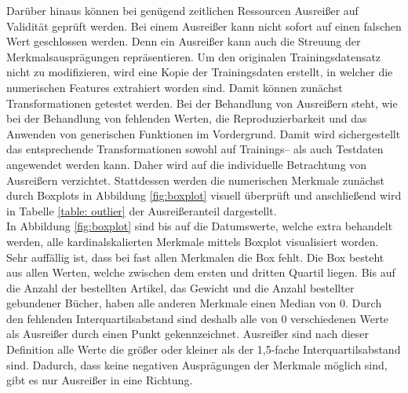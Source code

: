 Darüber hinaus können bei genügend zeitlichen Ressourcen Ausreißer auf Validität geprüft werden. Bei einem Ausreißer kann nicht sofort auf einen falschen Wert geschlossen werden. Denn ein Ausreißer kann auch die Streuung der Merkmalsausprägungen repräsentieren. Um den originalen Trainingsdatensatz nicht zu modifizieren, wird eine Kopie der Trainingsdaten erstellt, in welcher die numerischen Features extrahiert worden sind. Damit können zunächst Transformationen getestet werden. Bei der Behandlung von Ausreißern steht, wie bei der Behandlung von fehlenden Werten, die Reproduzierbarkeit und das Anwenden von generischen Funktionen im Vordergrund. Damit wird sichergestellt das entsprechende Transformationen sowohl auf Trainings– als auch Testdaten angewendet werden kann. Daher wird auf die individuelle Betrachtung von Ausreißern verzichtet. Stattdessen werden die numerischen Merkmale zunächst durch Boxplots in Abbildung \ref{fig:boxplot} visuell überprüft und anschließend wird in Tabelle \ref{table: outlier} der Ausreißeranteil dargestellt.\\

In Abbildung \ref{fig:boxplot} sind bis auf die Datumswerte, welche extra behandelt werden, alle kardinalskalierten Merkmale mittels Boxplot visualisiert worden. Sehr auffällig ist, dass bei fast allen Merkmalen die Box fehlt. Die Box besteht aus allen Werten, welche zwischen dem ersten und dritten Quartil liegen. Bis auf die Anzahl der bestellten Artikel, das Gewicht und die Anzahl bestellter gebundener Bücher, haben alle anderen Merkmale einen Median von 0. Durch den fehlenden Interquartilsabstand sind deshalb alle von 0 verschiedenen Werte als Ausreißer durch einen Punkt gekennzeichnet. Ausreißer sind nach dieser Definition alle Werte die größer oder kleiner als der 1,5-fache Interquartilsabstand sind. Dadurch, dass keine negativen Ausprägungen der Merkmale möglich sind, gibt es nur Ausreißer in eine Richtung.\\

